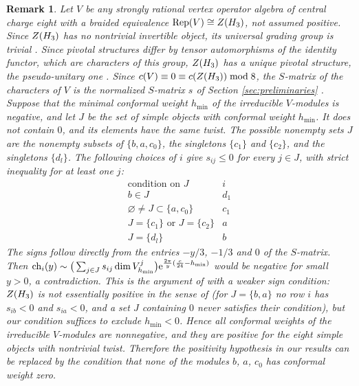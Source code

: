 \documentclass[leqno]{article}
\let\cal\relax
\newcommand{\cal}{\mathcal}
\renewcommand{\leq}{\ensuremath{\leqslant}}
\let\i\relax
\newcommand{\i}{\mathrm{i}}
\newcommand{\e}{\mathrm{e}}
\DeclareMathOperator{\Rep}{Rep}
\newtheorem{remark}[thm]{Remark}
\numberwithin{equation}{section}
\begin{document}
\begin{remark}\normalfont
\label{rem:essential-positivity}
Let $V$ be any strongly rational vertex operator algebra of central charge eight with a braided equivalence $\Rep(V) \cong Z(\cal H_3)$, not assumed positive. Since $Z(\cal H_3)$ has no nontrivial invertible object, its universal grading group is trivial \cite[Theorem 6.3]{GeN08}. Since pivotal structures differ by tensor automorphisms of the identity functor, which are characters of this group, $Z(\cal H_3)$ has a unique pivotal structure, the pseudo-unitary one \cite{ENO05}. Since $c(V) \equiv 0 \equiv c(Z(\cal H_3)) \bmod 8$, the $S$-matrix of the characters of $V$ is the normalized $S$-matrix $s$ of Section \ref{sec:preliminaries} \cite[Lemma 3.6]{MoR24a}. Suppose that the minimal conformal weight $h_{\min}$ of the irreducible $V$-modules is negative, and let $J$ be the set of simple objects with conformal weight $h_{\min}$. It does not contain $0$, and its elements have the same twist. The possible nonempty sets $J$ are the nonempty subsets of $\{b,a,c_0\}$, the singletons $\{c_1\}$ and $\{c_2\}$, and the singletons $\{d_l\}$. The following choices of $i$ give $s_{ij} \leq 0$ for every $j \in J$, with strict inequality for at least one $j$:
\[
\begin{array}{c|c}
\text{condition on } J & i \\ \hline
b \in J & d_1 \\
\varnothing \neq J \subset \{a,c_0\} & c_1 \\
J = \{c_1\} \text{ or } J = \{c_2\} & a \\
J = \{d_l\} & b
\end{array}
\]
The signs follow directly from the entries $-y/3$, $-1/3$ and $0$ of the $S$-matrix. Then $\operatorname{ch}_i(\i y) \sim \big(\sum_{j \in J}s_{ij}\dim V^j_{h_{\min}}\big)\e^{\frac{2\pi}{y}(\frac{c}{24}-h_{\min})}$ would be negative for small $y > 0$, a contradiction. This is the argument of \cite[Proposition 3.10]{MoR24a} with a weaker sign condition: $Z(\cal H_3)$ is not essentially positive in the sense of \cite{MoR24a} (for $J = \{b,a\}$ no row $i$ has $s_{ib} < 0$ and $s_{ia} < 0$, and a set $J$ containing $0$ never satisfies their condition), but our condition suffices to exclude $h_{\min} < 0$. Hence all conformal weights of the irreducible $V$-modules are nonnegative, and they are positive for the eight simple objects with nontrivial twist. Therefore the positivity hypothesis in our results can be replaced by the condition that none of the modules $b$, $a$, $c_0$ has conformal weight zero.
\end{remark}
\end{document}
